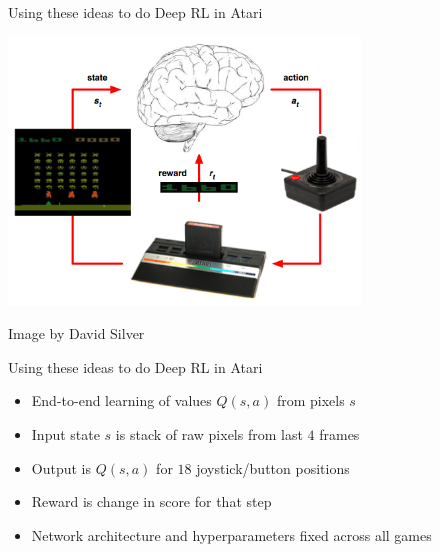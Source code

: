 \begin{frame}[c]{Using these ideas to do Deep RL in Atari}
	
\centering
\includegraphics[width=0.7\textwidth]{images/atari_deep_rl.png}

\begin{flushright}
	Image by David Silver
\end{flushright}
	
\end{frame}
\begin{frame}[c]{Using these ideas to do Deep RL in Atari}
	
\begin{itemize}
	\item End-to-end learning of values $Q(s, a)$ from pixels $s$
	\item Input state $s$ is stack of raw pixels from last $4$ frames
	\item Output is $Q(s, a)$ for $18$ joystick/button positions
	\item Reward is change in score for that step
	\item Network architecture and hyperparameters fixed across all games
\end{itemize}
	
\end{frame}



